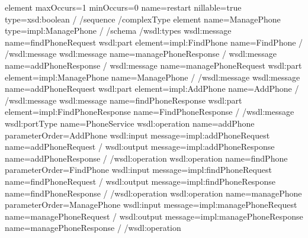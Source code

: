 \documentclass[letterpaper,10pt,english]{sphinxmanual}
\begin{document}
\begin{sphinxVerbatim}[commandchars=\\\{\}]
\PYGZlt{}element maxOccurs=\PYGZdq{}1\PYGZdq{} minOccurs=\PYGZdq{}0\PYGZdq{} name=\PYGZdq{}restart\PYGZdq{} nillable=\PYGZdq{}true\PYGZdq{} type=\PYGZdq{}xsd:boolean\PYGZdq{} /\PYGZgt{}
\PYGZlt{}/sequence\PYGZgt{}
\PYGZlt{}/complexType\PYGZgt{}
\PYGZlt{}element name=\PYGZdq{}ManagePhone\PYGZdq{} type=\PYGZdq{}impl:ManagePhone\PYGZdq{} /\PYGZgt{}
\PYGZlt{}/schema\PYGZgt{}
\PYGZlt{}/wsdl:types\PYGZgt{}
\PYGZlt{}wsdl:message name=\PYGZdq{}findPhoneRequest\PYGZdq{}\PYGZgt{}
\PYGZlt{}wsdl:part element=\PYGZdq{}impl:FindPhone\PYGZdq{} name=\PYGZdq{}FindPhone\PYGZdq{} /\PYGZgt{}
\PYGZlt{}/wsdl:message\PYGZgt{}
\PYGZlt{}wsdl:message name=\PYGZdq{}managePhoneResponse\PYGZdq{} /\PYGZgt{}
\PYGZlt{}wsdl:message name=\PYGZdq{}addPhoneResponse\PYGZdq{} /\PYGZgt{}
\PYGZlt{}wsdl:message name=\PYGZdq{}managePhoneRequest\PYGZdq{}\PYGZgt{}
\PYGZlt{}wsdl:part element=\PYGZdq{}impl:ManagePhone\PYGZdq{} name=\PYGZdq{}ManagePhone\PYGZdq{} /\PYGZgt{}
\PYGZlt{}/wsdl:message\PYGZgt{}
\PYGZlt{}wsdl:message name=\PYGZdq{}addPhoneRequest\PYGZdq{}\PYGZgt{}
\PYGZlt{}wsdl:part element=\PYGZdq{}impl:AddPhone\PYGZdq{} name=\PYGZdq{}AddPhone\PYGZdq{} /\PYGZgt{}
\PYGZlt{}/wsdl:message\PYGZgt{}
\PYGZlt{}wsdl:message name=\PYGZdq{}findPhoneResponse\PYGZdq{}\PYGZgt{}
\PYGZlt{}wsdl:part element=\PYGZdq{}impl:FindPhoneResponse\PYGZdq{} name=\PYGZdq{}FindPhoneResponse\PYGZdq{} /\PYGZgt{}
\PYGZlt{}/wsdl:message\PYGZgt{}
\PYGZlt{}wsdl:portType name=\PYGZdq{}PhoneService\PYGZdq{}\PYGZgt{}
\PYGZlt{}wsdl:operation name=\PYGZdq{}addPhone\PYGZdq{} parameterOrder=\PYGZdq{}AddPhone\PYGZdq{}\PYGZgt{}
\PYGZlt{}wsdl:input message=\PYGZdq{}impl:addPhoneRequest\PYGZdq{} name=\PYGZdq{}addPhoneRequest\PYGZdq{} /\PYGZgt{}
\PYGZlt{}wsdl:output message=\PYGZdq{}impl:addPhoneResponse\PYGZdq{} name=\PYGZdq{}addPhoneResponse\PYGZdq{} /\PYGZgt{}
\PYGZlt{}/wsdl:operation\PYGZgt{}
\PYGZlt{}wsdl:operation name=\PYGZdq{}findPhone\PYGZdq{} parameterOrder=\PYGZdq{}FindPhone\PYGZdq{}\PYGZgt{}
\PYGZlt{}wsdl:input message=\PYGZdq{}impl:findPhoneRequest\PYGZdq{} name=\PYGZdq{}findPhoneRequest\PYGZdq{} /\PYGZgt{}
\PYGZlt{}wsdl:output message=\PYGZdq{}impl:findPhoneResponse\PYGZdq{} name=\PYGZdq{}findPhoneResponse\PYGZdq{} /\PYGZgt{}
\PYGZlt{}/wsdl:operation\PYGZgt{}
\PYGZlt{}wsdl:operation name=\PYGZdq{}managePhone\PYGZdq{} parameterOrder=\PYGZdq{}ManagePhone\PYGZdq{}\PYGZgt{}
\PYGZlt{}wsdl:input message=\PYGZdq{}impl:managePhoneRequest\PYGZdq{} name=\PYGZdq{}managePhoneRequest\PYGZdq{} /\PYGZgt{}
\PYGZlt{}wsdl:output message=\PYGZdq{}impl:managePhoneResponse\PYGZdq{} name=\PYGZdq{}managePhoneResponse\PYGZdq{} /\PYGZgt{}
\PYGZlt{}/wsdl:operation\PYGZgt{}

\end{sphinxVerbatim}
\end{document}
